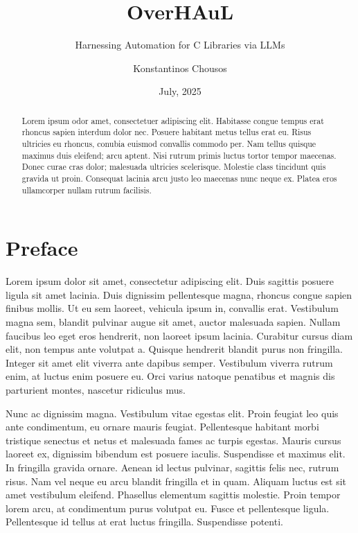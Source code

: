 \documentclass[
  a4paper,
  DIV=11,
  numbers=noendperiod]{scrreprt}
\title{OverHAuL}
\subtitle{Harnessing Automation for C Libraries via LLMs}
\author{Konstantinos Chousos}
\date{July, 2025}
\theoremstyle{definition}
\theoremstyle{remark}
\begin{document}
\maketitle
\begin{abstract}
Lorem ipsum odor amet, consectetuer adipiscing elit. Habitasse congue
tempus erat rhoncus sapien interdum dolor nec. Posuere habitant metus
tellus erat eu. Risus ultricies eu rhoncus, conubia euismod convallis
commodo per. Nam tellus quisque maximus duis eleifend; arcu aptent. Nisi
rutrum primis luctus tortor tempor maecenas. Donec curae cras dolor;
malesuada ultricies scelerisque. Molestie class tincidunt quis gravida
ut proin. Consequat lacinia arcu justo leo maecenas nunc neque ex.
Platea eros ullamcorper nullam rutrum facilisis.
\end{abstract}





\chapter*{Preface}\label{preface}


Lorem ipsum dolor sit amet, consectetur adipiscing elit. Duis sagittis
posuere ligula sit amet lacinia. Duis dignissim pellentesque magna,
rhoncus congue sapien finibus mollis. Ut eu sem laoreet, vehicula ipsum
in, convallis erat. Vestibulum magna sem, blandit pulvinar augue sit
amet, auctor malesuada sapien. Nullam faucibus leo eget eros hendrerit,
non laoreet ipsum lacinia. Curabitur cursus diam elit, non tempus ante
volutpat a. Quisque hendrerit blandit purus non fringilla. Integer sit
amet elit viverra ante dapibus semper. Vestibulum viverra rutrum enim,
at luctus enim posuere eu. Orci varius natoque penatibus et magnis dis
parturient montes, nascetur ridiculus mus.

Nunc ac dignissim magna. Vestibulum vitae egestas elit. Proin feugiat
leo quis ante condimentum, eu ornare mauris feugiat. Pellentesque
habitant morbi tristique senectus et netus et malesuada fames ac turpis
egestas. Mauris cursus laoreet ex, dignissim bibendum est posuere
iaculis. Suspendisse et maximus elit. In fringilla gravida ornare.
Aenean id lectus pulvinar, sagittis felis nec, rutrum risus. Nam vel
neque eu arcu blandit fringilla et in quam. Aliquam luctus est sit amet
vestibulum eleifend. Phasellus elementum sagittis molestie. Proin tempor
lorem arcu, at condimentum purus volutpat eu. Fusce et pellentesque
ligula. Pellentesque id tellus at erat luctus fringilla. Suspendisse
potenti.
\end{document}
